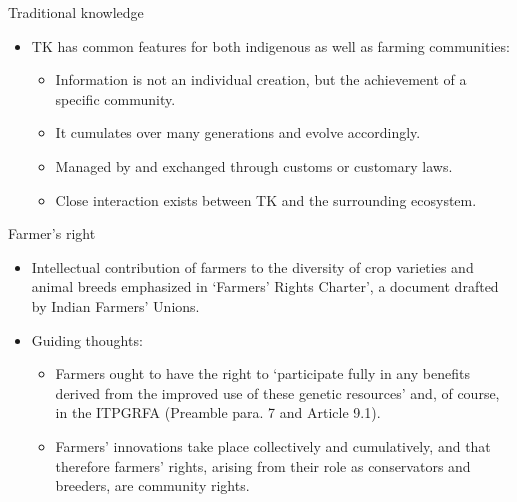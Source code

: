 \documentclass[
  ignorenonframetext,
  aspectratio=169]{beamer}
\providecommand{\tightlist}{%
  \setlength{\itemsep}{0pt}\setlength{\parskip}{0pt}}
\begin{document}
\begin{frame}{Traditional knowledge}
\protect\hypertarget{traditional-knowledge-2}{}
\begin{itemize}
\tightlist
\item
  TK has common features for both indigenous as well as farming
  communities:

  \begin{itemize}
  \tightlist
  \item
    Information is not an individual creation, but the achievement of a
    specific community.
  \item
    It cumulates over many generations and evolve accordingly.
  \item
    Managed by and exchanged through customs or customary laws.
  \item
    Close interaction exists between TK and the surrounding ecosystem.
  \end{itemize}
\end{itemize}
\end{frame}

\begin{frame}{Farmer's right}
\protect\hypertarget{farmers-right}{}
\begin{itemize}
\tightlist
\item
  Intellectual contribution of farmers to the diversity of crop
  varieties and animal breeds emphasized in `Farmers' Rights Charter', a
  document drafted by Indian Farmers' Unions.
\item
  Guiding thoughts:

  \begin{itemize}
  \tightlist
  \item
    Farmers ought to have the right to `participate fully in any
    benefits derived from the improved use of these genetic resources'
    and, of course, in the ITPGRFA (Preamble para. 7 and Article 9.1).
  \item
    Farmers' innovations take place collectively and cumulatively, and
    that therefore farmers' rights, arising from their role as
    conservators and breeders, are community rights.
  \end{itemize}
\end{itemize}
\end{frame}
\end{document}
